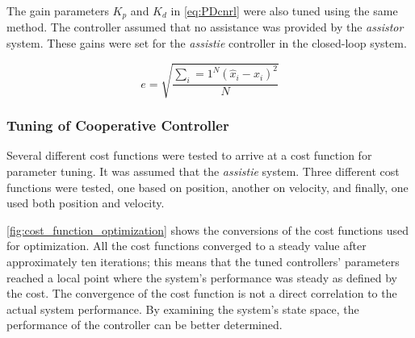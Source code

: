 The gain parameters $K_p$ and $K_d$ in \autoref{eq:PDcnrl} were also tuned using the same method. The controller assumed that no assistance was provided by the \textit{assistor} system. These gains were set for the \textit{assistie} controller in the closed-loop system.

\begin{equation}
    e = \sqrt{ \frac{ \sum_i=1^N ( \hat{x}_i - x_i )^2 }{N}  }
    \label{eq:RMSE}
\end{equation}

\subsubsection{Tuning of Cooperative Controller}
Several different cost functions were tested to arrive at a cost function for parameter tuning. It was assumed that the \textit{assistie} system. Three different cost functions were tested, one based on position, another on velocity, and finally, one used both position and velocity.


\autoref{fig:cost_function_optimization} shows the conversions of the cost functions used for optimization. All the cost functions converged to a steady value after approximately ten iterations; this means that the tuned controllers' parameters reached a local point where the system's performance was steady as defined by the cost. The convergence of the cost function is not a direct correlation to the actual system performance. By examining the system's state space, the performance of the controller can be better determined.





